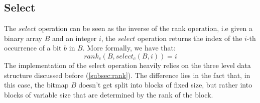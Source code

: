 


\subsection{Select}
The $select$ operation can be seen as the inverse of the rank operation, i.e given a binary array $B$ and an integer $i$, the $select$ operation returns the index of the $i$-th occurrence of a bit $b$ in $B$. More formally, we have that:
\[
    rank_c(B, select_c(B, i)) = i
\]
The implementation of the select operation heavily relies on the three level data structure discussed before (\ref{subsec:rank}). The difference lies in the fact that, in this case, the bitmap $B$ doesn't get split into blocks of fixed size, but rather into blocks of variable size that are determined by the rank of the block.
























